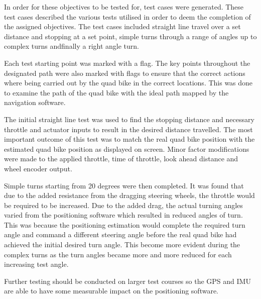 \documentclass[main.tex]{subfiles}
\begin{document}
In order for these objectives to be tested for, test cases were generated. These test cases described the various tests utilised in order to deem the completion of the assigned objectives. The test cases included straight line travel over a set distance and stopping at a set point, simple turns through a range of angles up to complex turns andfinally a right angle turn.
 
Each test starting point was marked with a flag. The key points throughout the designated path were also marked with flags to ensure that the correct actions where being carried out by the quad bike in the correct locations. This was done to examine the path of the quad bike with the ideal path mapped by the navigation software.

The initial straight line test was used to find the stopping distance and necessary throttle and actuator inputs to result in the desired distance travelled. The most important outcome of this test was to match the real quad bike position with the estimated quad bike position as displayed on screen. Minor factor modifications were made to the applied throttle, time of throttle, look ahead distance and wheel encoder output.

Simple turns starting from 20 degrees were then completed. It was found that due to the added resistance from the dragging steering wheels, the throttle would be required to be increased. Due to the added drag, the actual turning angles varied from the positioning software which resulted in reduced angles of turn. This was because the positioning estimation would complete the required turn angle and command a different steering angle before the real quad bike had achieved the initial desired turn angle. This become more evident during the complex turns as the turn angles became more and more reduced for each increasing test angle.


Further testing should be conducted on larger test courses so the GPS and IMU are able to have some measurable impact on the positioning software.
\end{document}
